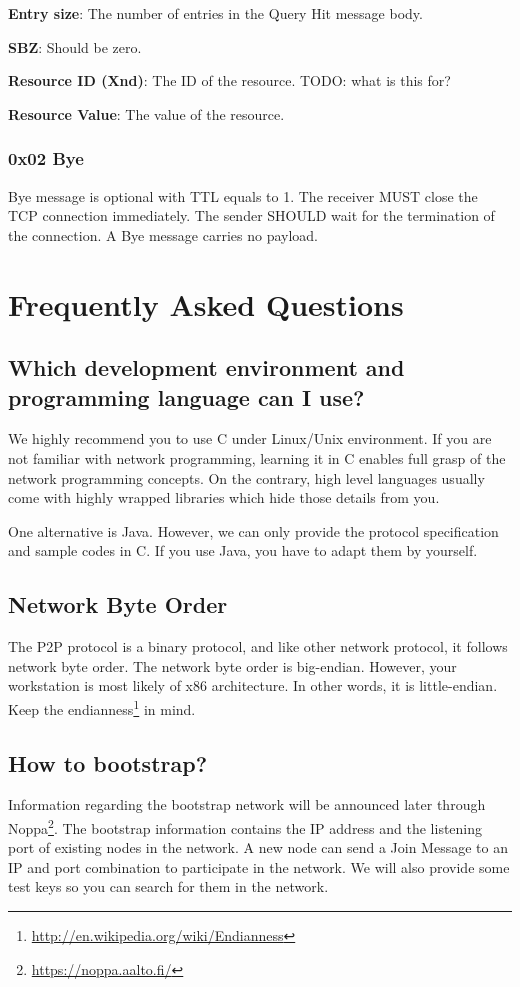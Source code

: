 \documentclass[12pt, a4paper]{article}
\newcommand{\TODO}[1]{\noindent\colorbox{aaltoYellow}{\color{black} TODO: #1}}
\begin{document}
\textbf{Entry size}: The number of entries in the Query Hit message body.

\textbf{SBZ}: Should be zero.

\textbf{Resource ID (Xnd)}: The ID of the resource. \TODO{what is this for?}

\textbf{Resource Value}: The value of the resource.

\subsubsection{0x02 Bye}
Bye message is optional with TTL equals to 1.
The receiver MUST close the TCP connection immediately.
The sender SHOULD wait for the termination of the connection.
A Bye message carries no payload.


\section{Frequently Asked Questions}

\subsection*{Which development environment and programming language can I use?}
We highly recommend you to use C under Linux/Unix environment.
If you are not familiar with network programming, learning it in C enables full grasp of the network programming concepts.
On the contrary, high level languages usually come with highly wrapped libraries which hide those details from you.

One alternative is Java.
However, we can only provide the protocol specification and sample codes in C.
If you use Java, you have to adapt them by yourself.

\subsection*{Network Byte Order}
The P2P protocol is a binary protocol, and like other network protocol, it follows network byte order.
The network byte order is big-endian.
However, your workstation is most likely of x86 architecture.
In other words, it is little-endian.
Keep the endianness\footnote{\url{http://en.wikipedia.org/wiki/Endianness}} in mind.

\subsection*{How to bootstrap?}
Information regarding the bootstrap network will be announced later through Noppa\footnote{\url{https://noppa.aalto.fi/}}.
The bootstrap information contains the IP address and the listening port of existing nodes in the network.
A new node can send a Join Message to an IP and port combination to participate in the network.
We will also provide some test keys so you can search for them in the network.
\end{document}
